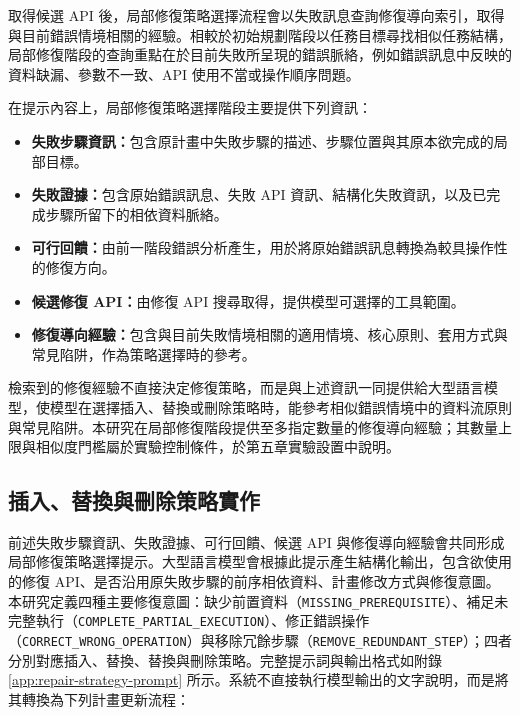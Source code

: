 \begin{ZhChapter}
取得候選 API 後，局部修復策略選擇流程會以失敗訊息查詢修復導向索引，取得與目前錯誤情境相關的經驗。相較於初始規劃階段以任務目標尋找相似任務結構，局部修復階段的查詢重點在於目前失敗所呈現的錯誤脈絡，例如錯誤訊息中反映的資料缺漏、參數不一致、API 使用不當或操作順序問題。

在提示內容上，局部修復策略選擇階段主要提供下列資訊：

\begin{itemize}
    \item \textbf{失敗步驟資訊：}包含原計畫中失敗步驟的描述、步驟位置與其原本欲完成的局部目標。
    \item \textbf{失敗證據：}包含原始錯誤訊息、失敗 API 資訊、結構化失敗資訊，以及已完成步驟所留下的相依資料脈絡。
    \item \textbf{可行回饋：}由前一階段錯誤分析產生，用於將原始錯誤訊息轉換為較具操作性的修復方向。
    \item \textbf{候選修復 API：}由修復 API 搜尋取得，提供模型可選擇的工具範圍。
    \item \textbf{修復導向經驗：}包含與目前失敗情境相關的適用情境、核心原則、套用方式與常見陷阱，作為策略選擇時的參考。
\end{itemize}

檢索到的修復經驗不直接決定修復策略，而是與上述資訊一同提供給大型語言模型，使模型在選擇插入、替換或刪除策略時，能參考相似錯誤情境中的資料流原則與常見陷阱。本研究在局部修復階段提供至多指定數量的修復導向經驗；其數量上限與相似度門檻屬於實驗控制條件，於第五章實驗設置中說明。

\subsection{插入、替換與刪除策略實作}

前述失敗步驟資訊、失敗證據、可行回饋、候選 API 與修復導向經驗會共同形成局部修復策略選擇提示。大型語言模型會根據此提示產生結構化輸出，包含欲使用的修復 API、是否沿用原失敗步驟的前序相依資料、計畫修改方式與修復意圖。本研究定義四種主要修復意圖：缺少前置資料（\texttt{MISSING\_PREREQUISITE}）、補足未完整執行（\texttt{COMPLETE\_PARTIAL\_EXECUTION}）、修正錯誤操作（\texttt{CORRECT\_WRONG\_OPERATION}）與移除冗餘步驟（\texttt{REMOVE\_REDUNDANT\_STEP}）；四者分別對應插入、替換、替換與刪除策略。完整提示詞與輸出格式如附錄 \ref{app:repair-strategy-prompt} 所示。系統不直接執行模型輸出的文字說明，而是將其轉換為下列計畫更新流程：


\end{ZhChapter}
